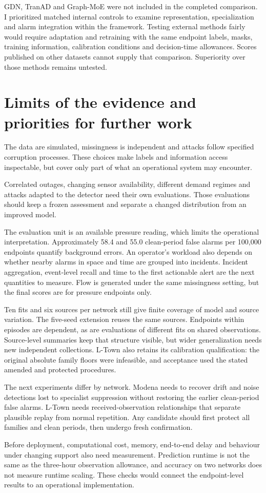 GDN, TranAD and Graph-MoE were not included in the completed comparison. I prioritized matched internal controls to examine representation, specialization and alarm integration within the framework. Testing external methods fairly would require adaptation and retraining with the same endpoint labels, masks, training information, calibration conditions and decision-time allowances. Scores published on other datasets cannot supply that comparison. Superiority over those methods remains untested.

\section{Limits of the evidence and priorities for further work}
The data are simulated, missingness is independent and attacks follow specified corruption processes. These choices make labels and information access inspectable, but cover only part of what an operational system may encounter.

Correlated outages, changing sensor availability, different demand regimes and attacks adapted to the detector need their own evaluations. Those evaluations should keep a frozen assessment and separate a changed distribution from an improved model.

The evaluation unit is an available pressure reading, which limits the operational interpretation. Approximately 58.4 and 55.0 clean-period false alarms per 100,000 endpoints quantify background errors. An operator's workload also depends on whether nearby alarms in space and time are grouped into incidents. Incident aggregation, event-level recall and time to the first actionable alert are the next quantities to measure. Flow is generated under the same missingness setting, but the final scores are for pressure endpoints only.

Ten fits and six sources per network still give finite coverage of model and source variation. The five-seed extension reuses the same sources. Endpoints within episodes are dependent, as are evaluations of different fits on shared observations. Source-level summaries keep that structure visible, but wider generalization needs new independent collections. L-Town also retains its calibration qualification: the original absolute family floors were infeasible, and acceptance used the stated amended and protected procedures.

The next experiments differ by network. Modena needs to recover drift and noise detections lost to specialist suppression without restoring the earlier clean-period false alarms. L-Town needs received-observation relationships that separate plausible replay from normal repetition. Any candidate should first protect all families and clean periods, then undergo fresh confirmation.

Before deployment, computational cost, memory, end-to-end delay and behaviour under changing support also need measurement. Prediction runtime is not the same as the three-hour observation allowance, and accuracy on two networks does not measure runtime scaling. These checks would connect the endpoint-level results to an operational implementation.
